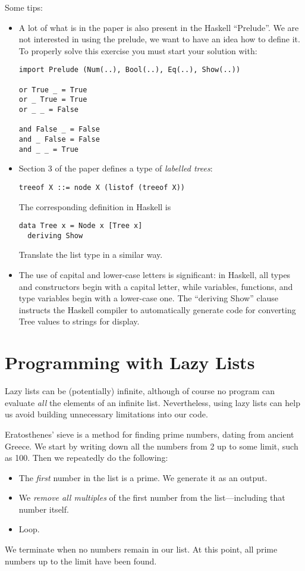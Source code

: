 \documentclass{article}
\begin{document}
Some tips:
\begin{itemize}
\item

A lot of what is in the paper is also present in the Haskell ``Prelude''.
We are not interested in using the prelude, we want to have an idea how
to define it. To properly solve this exercise you must start your solution
with: 

\begin{verbatim}
import Prelude (Num(..), Bool(..), Eq(..), Show(..))

or True _ = True
or _ True = True
or _ _ = False

and False _ = False
and _ False = False
and _ _ = True

\end{verbatim}

\item
Section 3 of the paper defines a type of {\em labelled trees}:
\begin{verbatim}
treeof X ::= node X (listof (treeof X))
\end{verbatim}
The corresponding definition in Haskell is
\begin{verbatim}
data Tree x = Node x [Tree x]
  deriving Show
\end{verbatim}
Translate the list type in a similar way.

\item
The use of capital and lower-case letters is significant: in Haskell,
all types and constructors begin with a capital letter, while
variables, functions, and type variables begin with a lower-case
one. The ``deriving Show'' clause instructs the Haskell compiler to
automatically generate code for converting Tree values to strings for
display.

\end{itemize}

\section{Programming with Lazy Lists\protect{}}
Lazy lists can be (potentially) infinite, although of course no
program can evaluate {\em all} the elements of an infinite
list. Nevertheless, using lazy lists can help us avoid building
unnecessary limitations into our code.

Eratosthenes' sieve is a method for finding prime numbers, dating from
ancient Greece. We start by writing down all the numbers from 2 up to
some limit, such as 100. Then we repeatedly do the following:
\begin{itemize}
\item
The {\em first} number in the list is a prime. We generate it as an
output.
\item
We {\em remove all multiples} of the first number from the
list---including that number itself.
\item
Loop.
\end{itemize}
We terminate when no numbers remain in our list. At this point, all
prime numbers up to the limit have been found.
\end{document}
